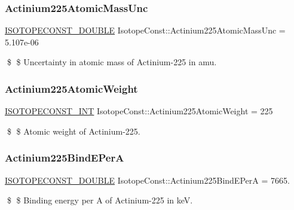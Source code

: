 \subsubsection{\texorpdfstring{Actinium225\+Atomic\+Mass\+Unc}{Actinium225AtomicMassUnc}}
{\footnotesize\ttfamily \mbox{\hyperlink{group___isotope_const-_macros_ga8f45a7272ce02c0b4c65c44636ed719a}{I\+S\+O\+T\+O\+P\+E\+C\+O\+N\+S\+T\+\_\+\+D\+O\+U\+B\+LE}} Isotope\+Const\+::\+Actinium225\+Atomic\+Mass\+Unc = 5.\+107e-\/06}

\$ \$ Uncertainty in atomic mass of Actinium-\/225 in amu. \mbox{\label{group___isotope_const-_actinium-_ac225_ga6c93227d23eaafc5547d605372c8d12e}} 
\subsubsection{\texorpdfstring{Actinium225\+Atomic\+Weight}{Actinium225AtomicWeight}}
{\footnotesize\ttfamily \mbox{\hyperlink{group___isotope_const-_macros_ga5f18360b3e99483a35c32d789e62621c}{I\+S\+O\+T\+O\+P\+E\+C\+O\+N\+S\+T\+\_\+\+I\+NT}} Isotope\+Const\+::\+Actinium225\+Atomic\+Weight = 225}

\$ \$ Atomic weight of Actinium-\/225. \mbox{\label{group___isotope_const-_actinium-_ac225_ga9cb0195ec4d4d41c8d2514b2bc0e4e49}} 
\subsubsection{\texorpdfstring{Actinium225\+Bind\+E\+PerA}{Actinium225BindEPerA}}
{\footnotesize\ttfamily \mbox{\hyperlink{group___isotope_const-_macros_ga8f45a7272ce02c0b4c65c44636ed719a}{I\+S\+O\+T\+O\+P\+E\+C\+O\+N\+S\+T\+\_\+\+D\+O\+U\+B\+LE}} Isotope\+Const\+::\+Actinium225\+Bind\+E\+PerA = 7665.}

\$ \$ Binding energy per A of Actinium-\/225 in keV. \mbox{\label{group___isotope_const-_actinium-_ac225_ga668e7948a1537a7da021a45b3b2a7285}} 

